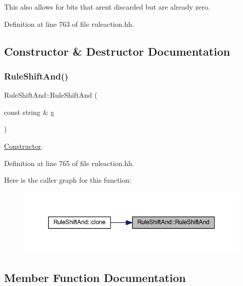 This also allows for bits that aren\textquotesingle{}t discarded but are already zero. 

Definition at line 763 of file ruleaction.\+hh.



\subsection{Constructor \& Destructor Documentation}
\mbox{\label{class_rule_shift_and_a798bf5be439f15c57dfbffb7dfab9244}} 
\subsubsection{\texorpdfstring{RuleShiftAnd()}{RuleShiftAnd()}}
{\footnotesize\ttfamily Rule\+Shift\+And\+::\+Rule\+Shift\+And (\begin{DoxyParamCaption}\item[{const string \&}]{g }\end{DoxyParamCaption})\hspace{0.3cm}{\ttfamily [inline]}}



\mbox{\hyperlink{class_constructor}{Constructor}}. 



Definition at line 765 of file ruleaction.\+hh.

Here is the caller graph for this function\+:
\nopagebreak
\begin{figure}[H]
\begin{center}
\leavevmode
\includegraphics[width=350pt]{class_rule_shift_and_a798bf5be439f15c57dfbffb7dfab9244_icgraph}
\end{center}
\end{figure}


\subsection{Member Function Documentation}
\mbox{\label{class_rule_shift_and_a46abea946abb40fa7bed25e4157d0f13}} 
